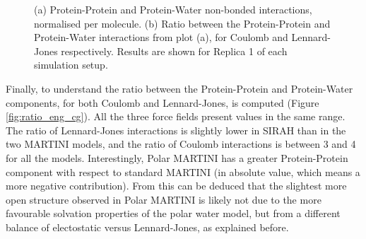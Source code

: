 \begin{figure}[p!]
\centering
{} 
\caption[Non-bonded protein energy contribution to capsule structures]{(a) Protein-Protein and Protein-Water non-bonded interactions, normalised per molecule. (b) Ratio between the Protein-Protein and Protein-Water interactions from plot (a), for Coulomb and Lennard-Jones respectively. Results are shown for Replica 1 of each simulation setup.}
\label{fig:eng_cg}
\end{figure}

Finally, to understand the ratio between the Protein-Protein and Protein-Water components, for both Coulomb and Lennard-Jones, is computed (Figure \ref{fig:ratio_eng_cg}).
%
All the three force fields present values in the same range.
%
The ratio of Lennard-Jones interactions is slightly lower in SIRAH than in the two MARTINI models, and the ratio of Coulomb interactions is between 3 and 4 for all the models.
%
Interestingly, Polar MARTINI has a greater Protein-Protein component with respect to standard MARTINI (in absolute value, which means a more negative contribution). From this can be deduced that the slightest more open structure observed in Polar MARTINI is likely not due to the more favourable solvation properties of the polar water model, but from a different balance of electostatic versus Lennard-Jones, as explained before.
 
